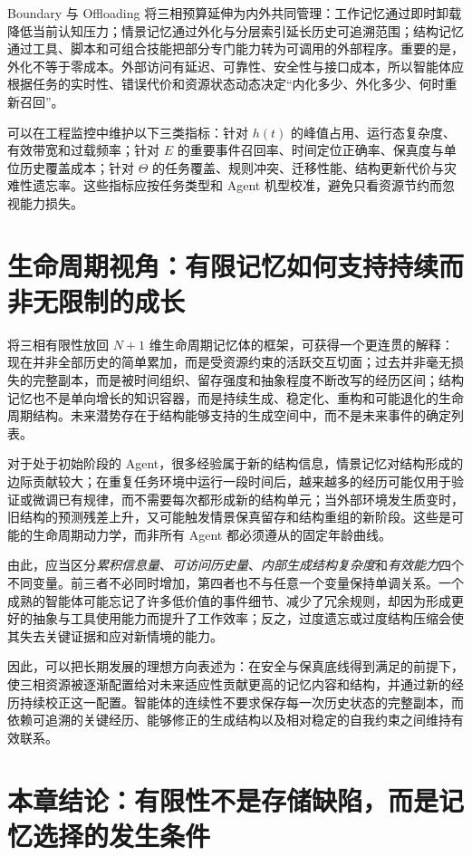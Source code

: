 Boundary 与 Offloading 将三相预算延伸为内外共同管理：工作记忆通过即时卸载降低当前认知压力；情景记忆通过外化与分层索引延长历史可追溯范围；结构记忆通过工具、脚本和可组合技能把部分专门能力转为可调用的外部程序。重要的是，外化不等于零成本。外部访问有延迟、可靠性、安全性与接口成本，所以智能体应根据任务的实时性、错误代价和资源状态动态决定“内化多少、外化多少、何时重新召回”。

可以在工程监控中维护以下三类指标：针对 $h(t)$ 的峰值占用、运行态复杂度、有效带宽和过载频率；针对 $E$ 的重要事件召回率、时间定位正确率、保真度与单位历史覆盖成本；针对 $\Theta$ 的任务覆盖、规则冲突、迁移性能、结构更新代价与灾难性遗忘率。这些指标应按任务类型和 Agent 机型校准，避免只看资源节约而忽视能力损失。

\section{生命周期视角：有限记忆如何支持持续而非无限制的成长}
\label{sec:lifecycle}

将三相有限性放回 $N+1$ 维生命周期记忆体的框架，可获得一个更连贯的解释：现在并非全部历史的简单累加，而是受资源约束的活跃交互切面；过去并非毫无损失的完整副本，而是被时间组织、留存强度和抽象程度不断改写的经历区间；结构记忆也不是单向增长的知识容器，而是持续生成、稳定化、重构和可能退化的生命周期结构。未来潜势存在于结构能够支持的生成空间中，而不是未来事件的确定列表。

对于处于初始阶段的 Agent，很多经验属于新的结构信息，情景记忆对结构形成的边际贡献较大；在重复任务环境中运行一段时间后，越来越多的经历可能仅用于验证或微调已有规律，而不需要每次都形成新的结构单元；当外部环境发生质变时，旧结构的预测残差上升，又可能触发情景保真留存和结构重组的新阶段。这些是可能的生命周期动力学，而非所有 Agent 都必须遵从的固定年龄曲线。

由此，应当区分\emph{累积信息量}、\emph{可访问历史量}、\emph{内部生成结构复杂度}和\emph{有效能力}四个不同变量。前三者不必同时增加，第四者也不与任意一个变量保持单调关系。一个成熟的智能体可能忘记了许多低价值的事件细节、减少了冗余规则，却因为形成更好的抽象与工具使用能力而提升了工作效率；反之，过度遗忘或过度结构压缩会使其失去关键证据和应对新情境的能力。

因此，可以把长期发展的理想方向表述为：在安全与保真底线得到满足的前提下，使三相资源被逐渐配置给对未来适应性贡献更高的记忆内容和结构，并通过新的经历持续校正这一配置。智能体的连续性不要求保存每一次历史状态的完整副本，而依赖可追溯的关键经历、能够修正的生成结构以及相对稳定的自我约束之间维持有效联系。

\section{本章结论：有限性不是存储缺陷，而是记忆选择的发生条件}
\label{sec:finitude-conclusion}


